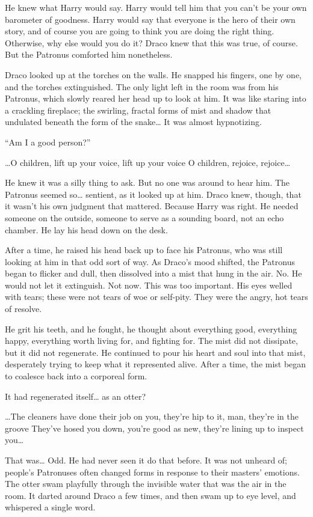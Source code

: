 He knew what Harry would say. Harry would tell him that you can’t be your own barometer of goodness. Harry would say that everyone is the hero of their own story, and of course you are going to think you are doing the right thing. Otherwise, why else would you do it? Draco knew that this was true, of course. But the Patronus comforted him nonetheless.

Draco looked up at the torches on the walls. He snapped his fingers, one by one, and the torches extinguished. The only light left in the room was from his Patronus, which slowly reared her head up to look at him. It was like staring into a crackling fireplace; the swirling, fractal forms of mist and shadow that undulated beneath the form of the snake… It was almost hypnotizing.

“Am I a good person?”

…O children, lift up your voice, lift up your voice
O children, rejoice, rejoice…

He knew it was a silly thing to ask. But no one was around to hear him. The Patronus seemed so… sentient, as it looked up at him. Draco knew, though, that it wasn’t his own judgment that mattered. Because Harry was right. He needed someone on the outside, someone to serve as a sounding board, not an echo chamber. He lay his head down on the desk.

After a time, he raised his head back up to face his Patronus, who was still looking at him in that odd sort of way. As Draco’s mood shifted, the Patronus began to flicker and dull, then dissolved into a mist that hung in the air. No. He would not let it extinguish. Not now. This was too important. His eyes welled with tears; these were not tears of woe or self-pity. They were the angry, hot tears of resolve.

He grit his teeth, and he fought, he thought about everything good, everything happy, everything worth living for, and fighting for. The mist did not dissipate, but it did not regenerate. He continued to pour his heart and soul into that mist, desperately trying to keep what it represented alive. After a time, the mist began to coalesce back into a corporeal form.

It had regenerated itself… as an otter?

…The cleaners have done their job on you, they’re hip to it, man, they’re in the groove
They’ve hosed you down, you’re good as new, they’re lining up to inspect you…

That was… Odd. He had never seen it do that before. It was not unheard of; people’s Patronuses often changed forms in response to their masters’ emotions. The otter swam playfully through the invisible water that was the air in the room. It darted around Draco a few times, and then swam up to eye level, and whispered a single word.

